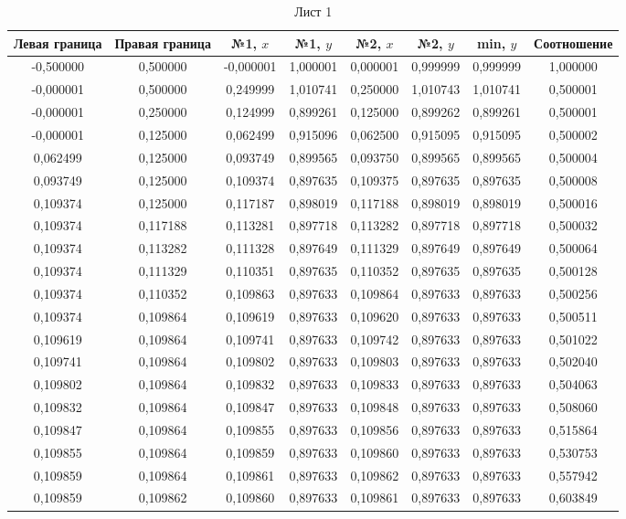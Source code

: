 

\begin{table}[h]
\center
\begin{tabular}{cccccccc}
\toprule
Левая граница & Правая граница 
& №1, $x$ & №1, $y$ 
& №2, $x$ & №2, $y$
& min, $y$  & Соотношение \\
\midrule
-0,500000 & 0,500000 & -0,000001 & 1,000001 & 0,000001 & 0,999999 & 0,999999 & 1,000000 \\ 
-0,000001 & 0,500000 & 0,249999  & 1,010741 & 0,250000 & 1,010743 & 1,010741 & 0,500001 \\
-0,000001 & 0,250000 & 0,124999  & 0,899261 & 0,125000 & 0,899262 & 0,899261 & 0,500001 \\
-0,000001 & 0,125000 & 0,062499  & 0,915096 & 0,062500 & 0,915095 & 0,915095 & 0,500002 \\ 
0,062499  & 0,125000 & 0,093749  & 0,899565 & 0,093750 & 0,899565 & 0,899565 & 0,500004 \\
0,093749  & 0,125000 & 0,109374  & 0,897635 & 0,109375 & 0,897635 & 0,897635 & 0,500008 \\
0,109374  & 0,125000 & 0,117187  & 0,898019 & 0,117188 & 0,898019 & 0,898019 & 0,500016 \\
0,109374  & 0,117188 & 0,113281  & 0,897718 & 0,113282 & 0,897718 & 0,897718 & 0,500032 \\
0,109374  & 0,113282 & 0,111328  & 0,897649 & 0,111329 & 0,897649 & 0,897649 & 0,500064 \\
0,109374  & 0,111329 & 0,110351  & 0,897635 & 0,110352 & 0,897635 & 0,897635 & 0,500128 \\
0,109374  & 0,110352 & 0,109863  & 0,897633 & 0,109864 & 0,897633 & 0,897633 & 0,500256 \\
0,109374  & 0,109864 & 0,109619  & 0,897633 & 0,109620 & 0,897633 & 0,897633 & 0,500511 \\
0,109619  & 0,109864 & 0,109741  & 0,897633 & 0,109742 & 0,897633 & 0,897633 & 0,501022 \\
0,109741  & 0,109864 & 0,109802  & 0,897633 & 0,109803 & 0,897633 & 0,897633 & 0,502040 \\
0,109802  & 0,109864 & 0,109832  & 0,897633 & 0,109833 & 0,897633 & 0,897633 & 0,504063 \\
0,109832  & 0,109864 & 0,109847  & 0,897633 & 0,109848 & 0,897633 & 0,897633 & 0,508060 \\
0,109847  & 0,109864 & 0,109855  & 0,897633 & 0,109856 & 0,897633 & 0,897633 & 0,515864 \\
0,109855  & 0,109864 & 0,109859  & 0,897633 & 0,109860 & 0,897633 & 0,897633 & 0,530753 \\
0,109859  & 0,109864 & 0,109861  & 0,897633 & 0,109862 & 0,897633 & 0,897633 & 0,557942 \\
0,109859  & 0,109862 & 0,109860  & 0,897633 & 0,109861 & 0,897633 & 0,897633 & 0,603849 \\ 
\bottomrule
\end{tabular}
\caption{Лист 1}
\end{table}

